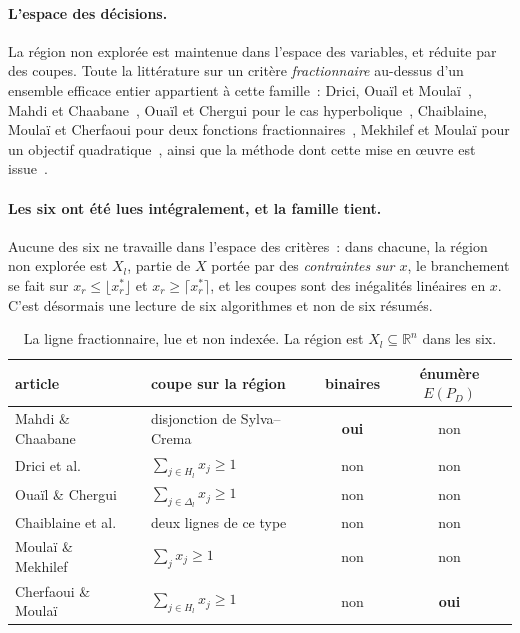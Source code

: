 \documentclass[12pt,a4paper]{report}
\newcommand{\E}{E(P_D)}
\theoremstyle{plain}
\theoremstyle{definition}
\begin{document}
\paragraph{L'espace des décisions.}
La région non explorée est maintenue dans l'espace des variables, et réduite
par des coupes.  Toute la littérature sur un critère \emph{fractionnaire}
au-dessus d'un ensemble efficace entier appartient à cette famille~: Drici,
Ouaïl et Moulaï~\cite{drici2018}, Mahdi et Chaabane~\cite{mahdi2015}, Ouaïl
et Chergui pour le cas hyperbolique~\cite{ouail2019}, Chaiblaine, Moulaï et
Cherfaoui pour deux fonctions fractionnaires~\cite{chaiblaine2020}, Mekhilef
et Moulaï pour un objectif quadratique~\cite{moulai2021}, ainsi que la
méthode dont cette mise en {\oe}uvre est issue~\cite{younsiabbaci2025}.

\paragraph{Les six ont été lues intégralement, et la famille tient.}
Aucune des six ne travaille dans l'espace des critères~: dans chacune, la
région non explorée est $X_l$, partie de $X$ portée par des
\emph{contraintes sur $x$}, le branchement se fait sur
$x_r \leqslant \lfloor x_r^* \rfloor$ et $x_r \geqslant \lceil x_r^* \rceil$,
et les coupes sont des inégalités linéaires en $x$.  C'est désormais une
lecture de six algorithmes et non de six résumés.

\begin{table}[h]
\centering
\caption{La ligne fractionnaire, lue et non indexée.  La région est
$X_l \subseteq \mathbb{R}^n$ dans les six.}
\label{tab:lues}
\small
\begin{tabular}{llcc}
\toprule
article & coupe sur la région & binaires & énumère $\E$ \\
\midrule
Mahdi \& Chaabane~\cite{mahdi2015}       & disjonction de Sylva--Crema        & \textbf{oui} & non \\
Drici et al.~\cite{drici2018}            & $\sum_{j \in H_l} x_j \geqslant 1$ & non & non \\
Oua\"il \& Chergui~\cite{ouail2019}      & $\sum_{j \in \Delta_l} x_j \geqslant 1$ & non & non \\
Chaiblaine et al.~\cite{chaiblaine2020}  & deux lignes de ce type             & non & non \\
Moula\"i \& Mekhilef~\cite{moulai2021}   & $\sum_{j} x_j \geqslant 1$         & non & non \\
Cherfaoui \& Moula\"i~\cite{cherfaoui2021} & $\sum_{j \in H_l} x_j \geqslant 1$ & non & \textbf{oui} \\
\bottomrule
\end{tabular}
\end{table}
\end{document}
